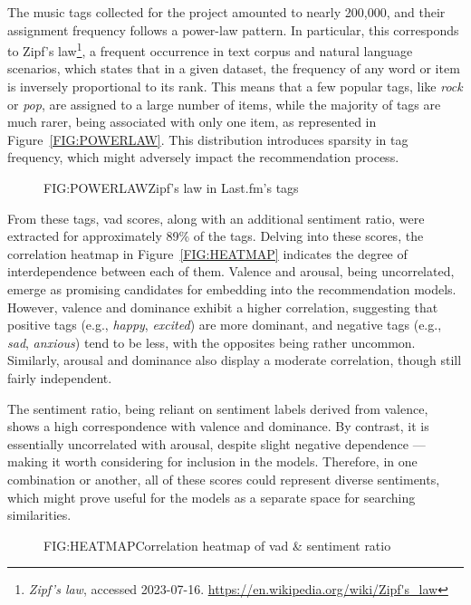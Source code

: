 The music tags collected for the project amounted to nearly 200,000, and their assignment frequency follows a power-law pattern. In particular, this corresponds to Zipf's law\footnote[1]{\emph{Zipf's law}, accessed 2023{-}07{-}16. \url{https://en.wikipedia.org/wiki/Zipf's_law}}, a frequent occurrence in text corpus and natural language scenarios, which states that in a given dataset, the frequency of any word or item is inversely proportional to its rank. This means that a few popular tags, like \emph{rock} or \emph{pop}, are assigned to a large number of items, while the majority of tags are much rarer, being associated with only one item, as represented in Figure~\ref{FIG:POWERLAW}. This distribution introduces sparsity in tag frequency, which might adversely impact the recommendation process.

\begin{figure}[Zipf's law in Last.fm's tags]{FIG:POWERLAW}{Zipf's law in Last.fm's tags}
\end{figure}

From these tags, \acs{vad} scores, along with an additional sentiment ratio, were extracted for approximately 89\% of the tags. Delving into these scores, the correlation heatmap in Figure~\ref{FIG:HEATMAP} indicates the degree of interdependence between each of them. Valence and arousal, being uncorrelated, emerge as promising candidates for embedding into the recommendation models. However, valence and dominance exhibit a higher correlation, suggesting that positive tags (e.g., \emph{happy}, \emph{excited}) are more dominant, and negative tags (e.g., \emph{sad}, \emph{anxious}) tend to be less, with the opposites being rather uncommon. Similarly, arousal and dominance also display a moderate correlation, though still fairly independent.

The sentiment ratio, being reliant on sentiment labels derived from valence, shows a high correspondence with valence and dominance. By contrast, it is essentially uncorrelated with arousal, despite slight negative dependence --- making it worth considering for inclusion in the models. Therefore, in one combination or another, all of these scores could represent diverse sentiments, which might prove useful for the models as a separate space for searching similarities.

\begin{figure}[Correlation heatmap of sentiment attributes]{FIG:HEATMAP}{Correlation heatmap of \acs{vad} \& sentiment ratio}
\end{figure}


